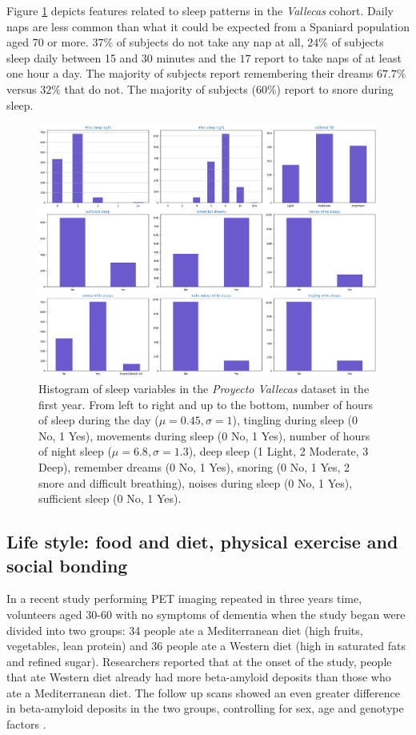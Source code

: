 \documentclass[11pt]{article}
\theoremstyle{definition}
\theoremstyle{remark}
\begin{document}
Figure \ref{fig:sleep} depicts features related to sleep patterns in the \emph{Vallecas} cohort. Daily naps are less common than what it could be expected from a Spaniard population aged 70 or more. $37\%$ of subjects do not take any nap at all, $24\%$ of subjects sleep daily between 15 and 30 minutes and the $17$ report to take naps of at least one hour a day. The majority of subjects report remembering their dreams $67.7\%$ versus $32\%$ that do not. The majority of subjects ($60\%$) report to snore during sleep. 
\begin{figure}[H]
        \centering
        \includegraphics[keepaspectratio, width=\linewidth]{figures/Fig_sleep}
        \caption{Histogram of sleep variables in the \emph{Proyecto Vallecas} dataset in the first year. From left to right and up to the bottom, number of hours of sleep during the day ($\mu=0.45, \sigma=1$), tingling during sleep (0 No, 1 Yes), movements during sleep (0 No, 1 Yes), number of hours of night sleep ($\mu=6.8, \sigma=1.3$), deep sleep (1 Light, 2 Moderate, 3 Deep), remember dreams (0 No, 1 Yes), snoring (0 No, 1 Yes, 2 snore and difficult breathing), noises during sleep (0 No, 1 Yes), sufficient sleep (0 No, 1 Yes).} 
        \label{fig:sleep}
\end{figure}


\subsection{Life style: food and diet, physical exercise and social bonding}
\label{ssse:life}

In a recent study performing PET imaging repeated in three years time, volunteers aged 30-60 with no symptoms of dementia when the study began were divided into two groups: 34 people ate a Mediterranean diet (high fruits, vegetables, lean protein) and 36 people ate a Western diet (high in saturated fats and refined sugar). Researchers reported that at the onset of the study, people that ate Western diet already had more beta-amyloid deposits than those who ate a Mediterranean diet. The follow up scans showed an even greater difference in beta-amyloid deposits in the two groups, controlling for sex, age and genotype factors \cite{berti2018mediterranean}.
\end{document}
